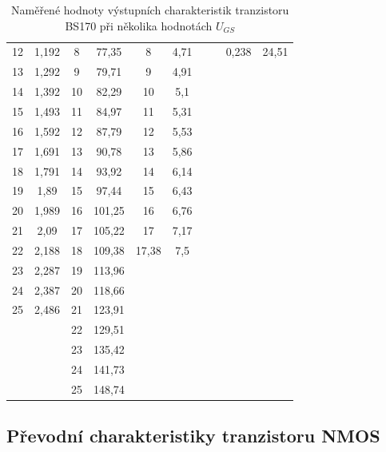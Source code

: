 \documentclass[a4paper, czech]{article}
\begin{document}
\begin{table}[H]
\begin{tabular}{cccccccccc}
        12 & 1,192 & 8    & 77,35  & 8     & 4,71  &      &       & 0,238 & 24,51 \\
        13 & 1,292 & 9    & 79,71  & 9     & 4,91  &      &       &       &       \\
        14 & 1,392 & 10   & 82,29  & 10    & 5,1   &      &       &       &       \\
        15 & 1,493 & 11   & 84,97  & 11    & 5,31  &      &       &       &       \\
        16 & 1,592 & 12   & 87,79  & 12    & 5,53  &      &       &       &       \\
        17 & 1,691 & 13   & 90,78  & 13    & 5,86  &      &       &       &       \\
        18 & 1,791 & 14   & 93,92  & 14    & 6,14  &      &       &       &       \\
        19 & 1,89  & 15   & 97,44  & 15    & 6,43  &      &       &       &       \\
        20 & 1,989 & 16   & 101,25 & 16    & 6,76  &      &       &       &       \\
        21 & 2,09  & 17   & 105,22 & 17    & 7,17  &      &       &       &       \\
        22 & 2,188 & 18   & 109,38 & 17,38 & 7,5   &      &       &       &       \\
        23 & 2,287 & 19   & 113,96 &       &       &      &       &       &       \\
        24 & 2,387 & 20   & 118,66 &       &       &      &       &       &       \\
        25 & 2,486 & 21   & 123,91 &       &       &      &       &       &       \\
           &       & 22   & 129,51 &       &       &      &       &       &       \\
           &       & 23   & 135,42 &       &       &      &       &       &       \\
           &       & 24   & 141,73 &       &       &      &       &       &       \\
           &       & 25   & 148,74 &       &       &      &       &       &       \\
    \bottomrule
    \end{tabular}
    \caption{Naměřené hodnoty výstupních charakteristik tranzistoru BS170 při několika hodnotách $U_{GS}$}
\end{table}

\subsection{Převodní charakteristiky tranzistoru NMOS}
\end{document}
